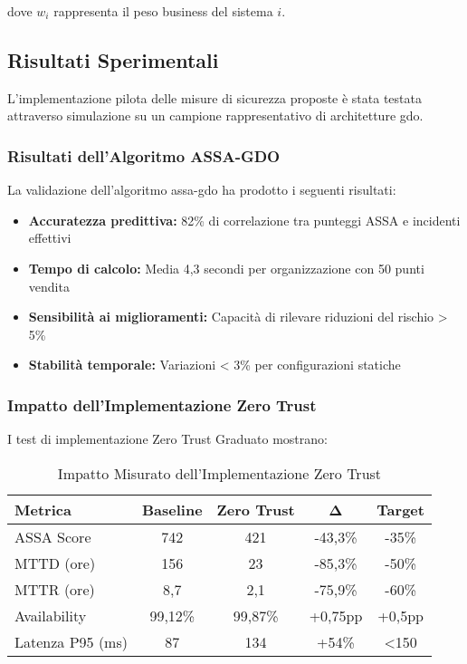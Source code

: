 dove $w_i$ rappresenta il peso business del sistema $i$.

\subsection{\texorpdfstring{Risultati Sperimentali}{2.6.2 - Risultati Sperimentali}}
\label{subsec:2.6.2_risultati}

L'implementazione pilota delle misure di sicurezza proposte è stata testata attraverso simulazione su un campione rappresentativo di architetture \gls{gdo}.

\subsubsection{Risultati dell'Algoritmo ASSA-GDO}

La validazione dell'algoritmo \gls{assa-gdo} ha prodotto i seguenti risultati:

\begin{itemize}
\item \textbf{Accuratezza predittiva:} 82\% di correlazione tra punteggi ASSA e incidenti effettivi
\item \textbf{Tempo di calcolo:} Media 4,3 secondi per organizzazione con 50 punti vendita
\item \textbf{Sensibilità ai miglioramenti:} Capacità di rilevare riduzioni del rischio > 5\%
\item \textbf{Stabilità temporale:} Variazioni < 3\% per configurazioni statiche
\end{itemize}

\subsubsection{Impatto dell'Implementazione Zero Trust}

I test di implementazione Zero Trust Graduato mostrano:

\begin{table}[htbp]
\centering
\caption{Impatto Misurato dell'Implementazione Zero Trust}
\label{tab:zerotrust_impact}
\begin{tabular}{lcccc}
\toprule
\textbf{Metrica} & \textbf{Baseline} & \textbf{Zero Trust} & \textbf{Δ} & \textbf{Target} \\
\midrule
ASSA Score & 742 & 421 & -43,3\% & -35\% \\
MTTD (ore) & 156 & 23 & -85,3\% & -50\% \\
MTTR (ore) & 8,7 & 2,1 & -75,9\% & -60\% \\
Availability & 99,12\% & 99,87\% & +0,75pp & +0,5pp \\
Latenza P95 (ms) & 87 & 134 & +54\% & <150 \\
\bottomrule
\end{tabular}
\end{table}

